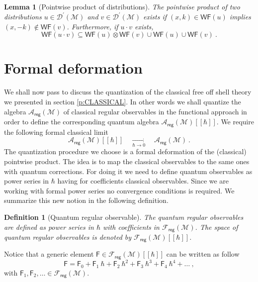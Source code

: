 \documentclass[11pt]{book}
\newcommand{\WF}{\mathsf{WF}}
\newcommand{\reg}{\mathsf{reg}}
\newcommand{\Acal}{\mathcal{A}}
\newcommand{\Dcal}{\mathcal{D}}
\newcommand{\Fcal}{\mathcal{F}}
\newcommand{\Mcal}{\mathcal{M}}
\newcommand{\Fsf}{\mathsf{F}}
\theoremstyle{break}
\newtheorem{lemma}{Lemma}[chapter]
\newtheorem{definition}{Definition}[chapter]
\begin{document}
\begin{lemma}[Pointwise product of distributions]\label{lem:prod_distrib_wf}
The pointwise product of two distributions $u\in\Dcal^\prime(\Mcal)$ and $v\in\Dcal^\prime(\Mcal)$ exists if $(x,k) \in \WF(u)$ implies $(x,-k) \notin \WF(v)$. Furthermore, if $u\cdot v$ exists, 
\begin{equation*}
\WF(u \cdot v) \subseteq \WF(u) \otimes \WF(v) \cup \WF(u) \cup \WF(v) \ . 
\end{equation*} 
%
\end{lemma}


\section{Formal deformation}
\label{p:Q_DEFORM}


We shall now pass to discuss the quantization of the classical free off shell theory we presented in section \ref{p:CLASSICAL}. In other words we shall quantize the algebra $\Acal_\reg(\Mcal)$ of classical regular observables in the functional approach in order to define the corresponding quantum algebra $\Acal_\reg(\Mcal)[[\hbar]]$. We require the following formal classical limit
%
\begin{equation*}
\Acal_\reg(\Mcal)[[\hbar]] \quad \underset{\hbar \to 0}{\longrightarrow} \quad \Acal_\reg(\Mcal) \ . 
\end{equation*}
%
The quantization procedure we choose is a formal deformation of the (classical) pointwise product. The idea is to map the classical observables to the same ones with quantum corrections. For doing it we need to define quantum observables as power series in $\hbar$ having for coefficients classical observables. Since we are working with formal power series no convergence conditions is required. We summarize this new notion in the following definition.


\begin{definition}[Quantum regular observable]\label{def:obs_reg_q}
The quantum regular observables are defined as power series in $\hbar$ with coefficients in $\Fcal_\reg(\Mcal)$. The space of quantum regular observables is denoted by $\Fcal_\reg(\Mcal)[[\hbar]]$.
\end{definition}

Notice that a generic element $\Fsf \in \Fcal_\reg(\Mcal)[[\hbar]]$ can be written as follow
%
\begin{equation*}
\Fsf = \Fsf_0 + \Fsf_1 \ \hbar + \Fsf_2 \ \hbar^2 + \Fsf_3 \ \hbar^3 + \Fsf_4 \ \hbar^4 + \dots \ ,
\end{equation*}
%
with $\Fsf_1, \Fsf_2, \dots \in \Fcal_\reg(\Mcal)$. 
\end{document}
